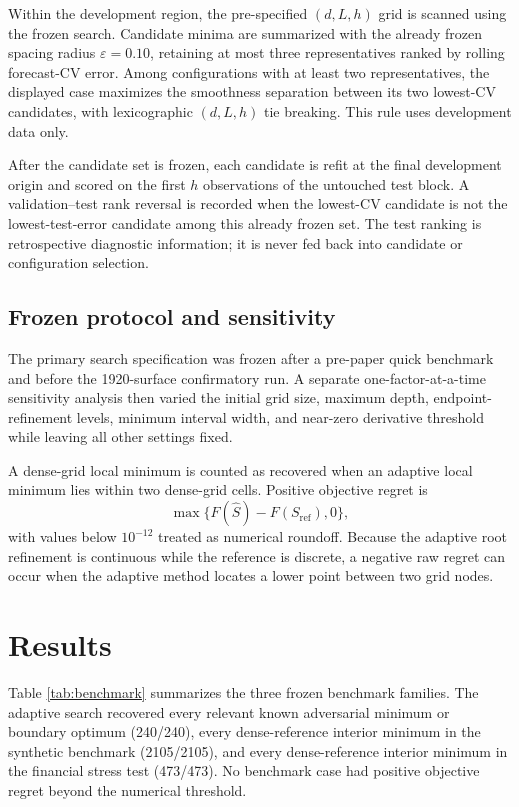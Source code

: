 \documentclass[english]{smcca}
\begin{document}
Within the development region, the pre-specified \((d,L,h)\) grid is scanned
using the frozen search. Candidate minima are summarized with the already
frozen spacing radius \(\varepsilon=0.10\), retaining at most three
representatives ranked by rolling forecast-CV error. Among configurations with
at least two representatives, the displayed case maximizes the smoothness
separation between its two lowest-CV candidates, with lexicographic
\((d,L,h)\) tie breaking. This rule uses development data only.

After the candidate set is frozen, each candidate is refit at the final
development origin and scored on the first \(h\) observations of the untouched
test block. A validation--test rank reversal is recorded when the lowest-CV
candidate is not the lowest-test-error candidate among this already frozen set.
The test ranking is retrospective diagnostic information; it is never fed back
into candidate or configuration selection.

\subsection{Frozen protocol and sensitivity}

The primary search specification was frozen after a pre-paper quick benchmark and before the 1920-surface confirmatory run. A separate one-factor-at-a-time sensitivity analysis then varied the initial grid size, maximum depth, endpoint-refinement levels, minimum interval width, and near-zero derivative threshold while leaving all other settings fixed.

A dense-grid local minimum is counted as recovered when an adaptive local minimum lies within two dense-grid cells. Positive objective regret is
\[
\max\{F(\widehat S)-F(S_{\mathrm{ref}}),0\},
\]
with values below \(10^{-12}\) treated as numerical roundoff. Because the adaptive root refinement is continuous while the reference is discrete, a negative raw regret can occur when the adaptive method locates a lower point between two grid nodes.

\section{Results}

Table \ref{tab:benchmark} summarizes the three frozen benchmark families. The adaptive search recovered every relevant known adversarial minimum or boundary optimum (240/240), every dense-reference interior minimum in the synthetic benchmark (2105/2105), and every dense-reference interior minimum in the financial stress test (473/473). No benchmark case had positive objective regret beyond the numerical threshold.
\end{document}
